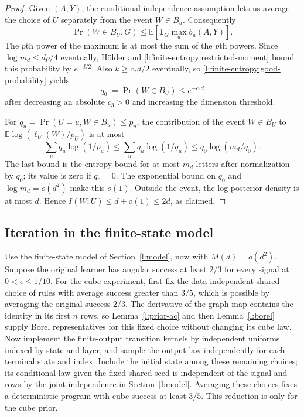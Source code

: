 \begin{proof}
Given \((A,Y)\), the conditional independence assumption lets us
average the choice of \(U\) separately from the event \(W\in B_u\).
Consequently
\[
 \Pr(W\in B_U,G)\le\mathbb E[\mathbf1_G\max_u b_u(A,Y)].
\]
The \(p\)th power of the maximum is at most the sum of the \(p\)th
powers.  Since \(\log m_d\le dp/4\) eventually, H\"older and
\eqref{l:finite-entropy:restricted-moment} bound this probability by
\(e^{-d/2}\).  Also \(k\ge c_*d/2\) eventually, so
\eqref{l:finite-entropy:good-probability} yields
\[
 q_0:=\Pr(W\in B_U)\le e^{-c_3d}
\]
after decreasing an absolute \(c_3>0\) and increasing the dimension
threshold.

For \(q_u=\Pr(U=u,W\in B_u)\le p_u\), the contribution of the
event \(W\in B_U\) to
\(\mathbb E\log(\ell_U(W)/p_U)\) is at most
\[
 \sum_uq_u\log(1/p_u)
 \le\sum_uq_u\log(1/q_u)
 \le q_0\log(m_d/q_0).
\]
The last bound is the entropy bound for at most \(m_d\) letters
after normalization by \(q_0\); its value is zero if \(q_0=0\).
The exponential bound on \(q_0\) and \(\log m_d=o(d^2)\) make
this \(o(1)\).  Outside the event, the log posterior density is at
most \(d\).  Hence \(I(W;U)\le d+o(1)\le2d\), as claimed.
\end{proof}

\subsection{Iteration in the finite-state model}

Use the finite-state model of Section~\ref{l:model}, now
with \(M(d)=o(d^2)\).  Suppose the original learner has angular
success at least \(2/3\) for every signal at \(0<\epsilon\le1/10\).
For the cube experiment, first fix the data-independent shared choice
of rules with average success greater than \(3/5\), which is possible
by averaging the original success \(2/3\).  The derivative of the graph
map contains the identity in its first \(n\) rows, so
Lemma~\ref{l:prior-ac} and then Lemma~\ref{l:borel} supply Borel
representatives for this fixed choice without changing its cube law.
Now implement the finite-output transition kernels by independent
uniforms indexed by state and layer, and sample the output law
independently for each terminal state and index.  Include the initial
state among these remaining choices; its conditional law given the
fixed shared seed is independent of the signal and rows by the joint
independence in Section~\ref{l:model}.  Averaging these choices fixes
a deterministic program with cube success at least
\(3/5\).  This reduction is only for the cube prior.

